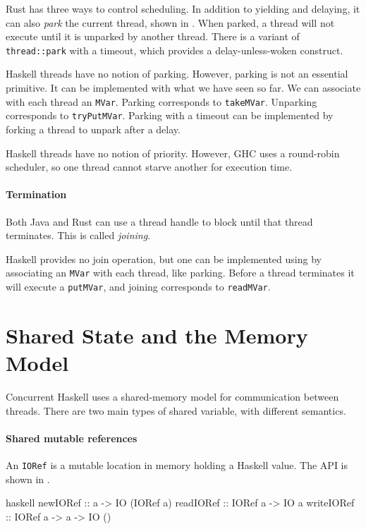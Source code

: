 Rust has three ways to control scheduling.  In addition to yielding
and delaying, it can also \emph{park} the current thread, shown in
.  When parked, a thread will not execute
until it is unparked by another thread.  There is a variant of
\verb|thread::park| with a timeout, which provides a
delay-unless-woken construct.

Haskell threads have no notion of parking.  However, parking is not an
essential primitive.  It can be implemented with what we have seen so
far.  We can associate with each thread an \verb|MVar|.  Parking
corresponds to \verb|takeMVar|.  Unparking corresponds to
\verb|tryPutMVar|.  Parking with a timeout can be implemented by
forking a thread to unpark after a delay.

Haskell threads have no notion of priority.  However, GHC uses a
round-robin scheduler, so one thread cannot starve another for
execution time.

\paragraph{Termination}
Both Java and Rust can use a thread handle to block until that thread
terminates.  This is called \emph{joining}.

Haskell provides no join operation, but one can be implemented using
by associating an \verb|MVar| with each thread, like parking.  Before
a thread terminates it will execute a \verb|putMVar|, and joining
corresponds to \verb|readMVar|.

\section{Shared State and the Memory Model}
\label{sec:concurrent_haskell-mmodel}

Concurrent Haskell uses a shared-memory model for communication
between threads.  There are two main types of shared variable, with
different semantics.

\paragraph{Shared mutable references}
An \verb|IORef| is a mutable location in memory holding a Haskell
value.  The API is shown in .

\begin{listing}
\centering
\begin{cminted}{haskell}
newIORef   :: a -> IO (IORef a)
readIORef  :: IORef a -> IO a
writeIORef :: IORef a -> a -> IO ()
\end{cminted}
\caption{Shared mutable references in Haskell.}\label{lst:smref_haskell}
\end{listing}


